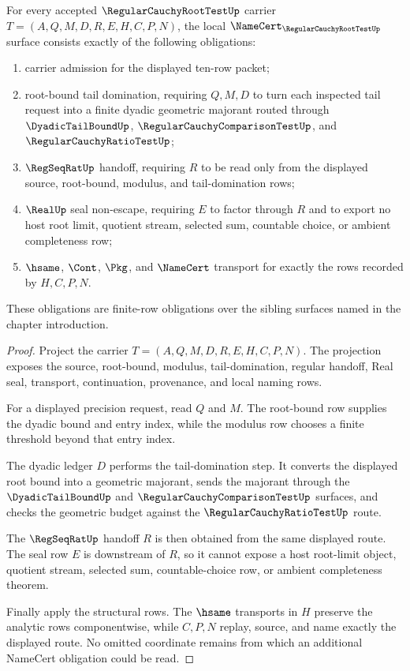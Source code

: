\begin{theorem}
\label{thm:regular-cauchy-root-test-namecert-obligations}
For every accepted $\RegularCauchyRootTestUp$ carrier $T=(A,Q,M,D,R,E,H,C,P,N)$, the local $\NameCert_{\RegularCauchyRootTestUp}$ surface consists exactly of the following obligations:
\begin{enumerate}
\item carrier admission for the displayed ten-row packet;
\item root-bound tail domination, requiring $Q,M,D$ to turn each inspected tail request into a finite dyadic geometric majorant routed through $\DyadicTailBoundUp$, $\RegularCauchyComparisonTestUp$, and $\RegularCauchyRatioTestUp$;
\item $\RegSeqRatUp$ handoff, requiring $R$ to be read only from the displayed source, root-bound, modulus, and tail-domination rows;
\item $\RealUp$ seal non-escape, requiring $E$ to factor through $R$ and to export no host root limit, quotient stream, selected sum, countable choice, or ambient completeness row;
\item $\hsame$, $\Cont$, $\Pkg$, and $\NameCert$ transport for exactly the rows recorded by $H,C,P,N$.
\end{enumerate}
These obligations are finite-row obligations over the sibling surfaces named in the chapter introduction.
\end{theorem}
\begin{proof}
Project the carrier $T=(A,Q,M,D,R,E,H,C,P,N)$. The projection exposes the source, root-bound, modulus, tail-domination, regular handoff, Real seal, transport, continuation, provenance, and local naming rows.

For a displayed precision request, read $Q$ and $M$. The root-bound row supplies the dyadic bound and entry index, while the modulus row chooses a finite threshold beyond that entry index.

The dyadic ledger $D$ performs the tail-domination step. It converts the displayed root bound into a geometric majorant, sends the majorant through the $\DyadicTailBoundUp$ and $\RegularCauchyComparisonTestUp$ surfaces, and checks the geometric budget against the $\RegularCauchyRatioTestUp$ route.

The $\RegSeqRatUp$ handoff $R$ is then obtained from the same displayed route. The seal row $E$ is downstream of $R$, so it cannot expose a host root-limit object, quotient stream, selected sum, countable-choice row, or ambient completeness theorem.

Finally apply the structural rows. The $\hsame$ transports in $H$ preserve the analytic rows componentwise, while $C,P,N$ replay, source, and name exactly the displayed route. No omitted coordinate remains from which an additional NameCert obligation could be read.
\end{proof}

